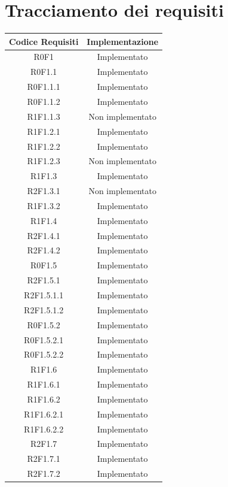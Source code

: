 \appendix
\section{Tracciamento dei requisiti}
\label{sec:Tracciamento}

\normalsize
\begin{longtable}{|c|c|}
	\hline
	\textbf{Codice Requisiti} & \textbf{Implementazione} \\
	\hline
	\endhead
	R0F1 & Implementato\\
	\hline
	R0F1.1  & Implementato\\
	\hline
	R0F1.1.1  & Implementato\\
	\hline
	R0F1.1.2  & Implementato\\
	\hline
	R1F1.1.3 & Non implementato\\
	\hline
	R1F1.2.1 & Implementato\\
	\hline
	R1F1.2.2 & Implementato\\
	\hline
	R1F1.2.3 & Non implementato\\
	\hline
	R1F1.3 & Implementato\\
	\hline
	R2F1.3.1 & Non implementato\\
	\hline
	R1F1.3.2 & Implementato\\
	\hline
	R1F1.4 & Implementato\\
	\hline
	R2F1.4.1 & Implementato\\
	\hline
	R2F1.4.2 & Implementato\\
	\hline
	R0F1.5 & Implementato\\
	\hline
	R2F1.5.1 & Implementato\\
	\hline
	R2F1.5.1.1 & Implementato\\
	\hline
	R2F1.5.1.2 & Implementato\\
	\hline
	R0F1.5.2 & Implementato\\
	\hline
	R0F1.5.2.1 & Implementato\\
	\hline
	R0F1.5.2.2 & Implementato\\
	\hline
	R1F1.6 & Implementato\\
	\hline
	R1F1.6.1 & Implementato\\
	\hline
	R1F1.6.2 & Implementato\\
	\hline
	R1F1.6.2.1 & Implementato\\
	\hline
	R1F1.6.2.2 & Implementato\\
	\hline
	R2F1.7 & Implementato\\
	\hline
	R2F1.7.1 & Implementato\\
	\hline
	R2F1.7.2 & Implementato\\

\end{longtable}
